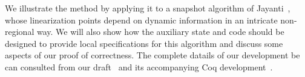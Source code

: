 We illustrate the method by applying it to a snapshot algorithm of
Jayanti~\cite{Jayanti:STOC05}, whose linearization points depend on
dynamic information in an intricate non-regional way. We will also
show how the auxiliary state and code should be designed to provide
local specifications for this algorithm and discuss some aspects of
our proof of correctness. The complete datails of our development be
can consulted from our draft~\cite{DelbiancoSNB16+arxiv16} and its
accompanying Coq development~\cite{CoqFiles}.

%
%
%
%
%
%
%
%

